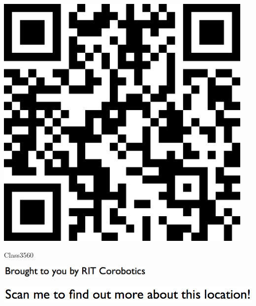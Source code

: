 \documentclass[letterpaper]{article}
\begin{document}
 \begingroup 
 \centerline{\includegraphics[scale=1,width=5in,height=5in]{Class3560.png}} 
 \endgroup 
 \vspace*{\fill} 

 \hfill{\small Class3560} 

  \vspace{0.7in} 
 
 \centerline{\includegraphics[scale=1,width=3in]{text-bottom.png}} 
 
 \pagebreak 
{} 
 \vspace*{\fill} 
 
  \centerline{\includegraphics[scale=1,width=6in]{text-top.png}} 
 
 \vspace{0.5in} 
 
\end{document}
